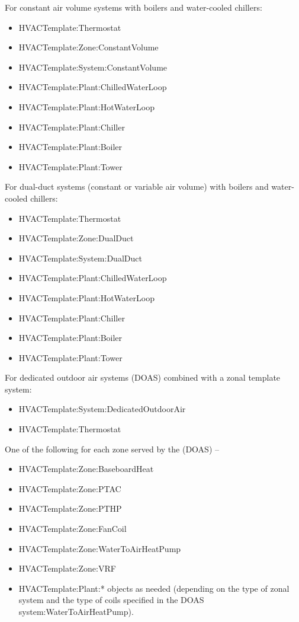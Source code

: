 For constant air volume systems with boilers and water-cooled chillers:

\begin{itemize}
\item
  HVACTemplate:Thermostat
\item
  HVACTemplate:Zone:ConstantVolume
\item
  HVACTemplate:System:ConstantVolume
\item
  HVACTemplate:Plant:ChilledWaterLoop
\item
  HVACTemplate:Plant:HotWaterLoop
\item
  HVACTemplate:Plant:Chiller
\item
  HVACTemplate:Plant:Boiler
\item
  HVACTemplate:Plant:Tower
\end{itemize}

For dual-duct systems (constant or variable air volume) with boilers and water-cooled chillers:

\begin{itemize}
\item
  HVACTemplate:Thermostat
\item
  HVACTemplate:Zone:DualDuct
\item
  HVACTemplate:System:DualDuct
\item
  HVACTemplate:Plant:ChilledWaterLoop
\item
  HVACTemplate:Plant:HotWaterLoop
\item
  HVACTemplate:Plant:Chiller
\item
  HVACTemplate:Plant:Boiler
\item
  HVACTemplate:Plant:Tower
\end{itemize}

For dedicated outdoor air systems (DOAS) combined with a zonal template system:

\begin{itemize}
\item
  HVACTemplate:System:DedicatedOutdoorAir
\item
  HVACTemplate:Thermostat
\end{itemize}

One of the following for each zone served by the (DOAS) --

\begin{itemize}
\item
  HVACTemplate:Zone:BaseboardHeat
\item
  HVACTemplate:Zone:PTAC
\item
  HVACTemplate:Zone:PTHP
\item
  HVACTemplate:Zone:FanCoil
\item
  HVACTemplate:Zone:WaterToAirHeatPump
\item
  HVACTemplate:Zone:VRF
\item
  HVACTemplate:Plant:* objects as needed (depending on the type of zonal system and the type of coils specified in the DOAS system:WaterToAirHeatPump).
\end{itemize}

